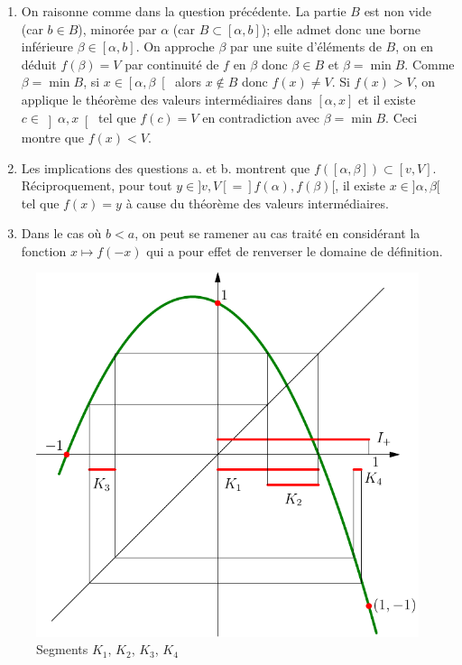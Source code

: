 \begin{enumerate}
\begin{enumerate}
  Si $f(x)< v$, on applique le théorème des valeurs intermédiaires dans $\left[x,b\right]$ et il existe $c\in \left] x,b\right[$ tel que $f(c)=v$ en contradiction avec $\alpha = \max A$. Ceci montre que $f(x)>v$.     
  \item On raisonne comme dans la question précédente. La partie $B$ est non vide (car $b \in B$), minorée par $\alpha$ (car $B\subset [\alpha, b]$); elle admet donc une borne inférieure $\beta\in [\alpha,b]$. On approche $\beta$ par une suite d'éléments de $B$, on en déduit $f(\beta)=V$ par continuité de $f$ en $\beta$ donc $\beta\in B$ et $\beta=\min B$.\newline
  Comme $\beta = \min B$, si $x \in \left[\alpha ,\beta\right[$ alors $x\notin B$ donc $f(x) \neq V$.\newline
  Si $f(x)> V$, on applique le théorème des valeurs intermédiaires dans $\left[\alpha, x\right]$ et il existe $c\in \left]\alpha, x\right[$ tel que $f(c)=V$ en contradiction avec $\beta = \min B$. Ceci montre que $f(x) < V$.     
  
  \item Les implications des questions a. et b. montrent que $f([\alpha,\beta])\subset [v,V]$. Réciproquement, pour tout $y\in ]v,V[ = ]f(\alpha),f(\beta)[$, il existe $x \in]\alpha, \beta[$ tel que $f(x)=y$ à cause du théorème des valeurs intermédiaires.
  \item Dans le cas où $b < a$, on peut se ramener au cas traité en considérant la fonction $x\mapsto f(-x)$ qui a pour effet de renverser le domaine de définition.
\end{enumerate}

\end{enumerate}

\begin{figure}[h]
  \centering
  \includegraphics{./Cp3impko_1.pdf}
  \caption{Segments $K_1$, $K_2$, $K_3$, $K_4$}
  \label{fig: Cp3impko_1}
\end{figure}

